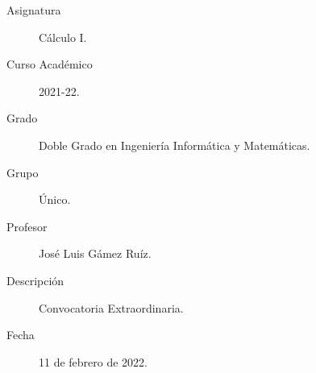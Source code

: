 \documentclass[12pt]{article}
\begin{document}

    
    

    \begin{description}
        \item[Asignatura] Cálculo I.
        \item[Curso Académico] 2021-22.
        \item[Grado] Doble Grado en Ingeniería Informática y Matemáticas.
        \item[Grupo] Único.
        \item[Profesor] José Luis Gámez Ruíz.
        \item[Descripción] Convocatoria Extraordinaria.
        \item[Fecha] 11 de febrero de 2022.
    
    \end{description}
    \newpage
    
\end{document}

